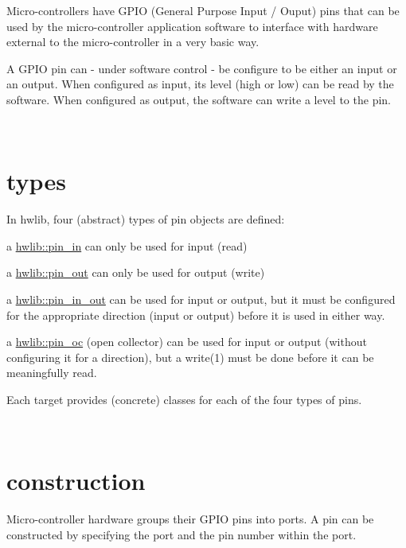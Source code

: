 Micro-\/controllers have G\+P\+IO (General Purpose Input / Ouput) pins that can be used by the micro-\/controller application software to interface with hardware external to the micro-\/controller in a very basic way.

A G\+P\+IO pin can -\/ under software control -\/ be configure to be either an input or an output. When configured as input, its level (high or low) can be read by the software. When configured as output, the software can write a level to the pin.

~\newline
 

\hypertarget{pins_pin-types}{}\section{types}\label{pins_pin-types}
In hwlib, four (abstract) types of pin objects are defined\+:


\begin{DoxyItemize}
\item a \hyperlink{classhwlib_1_1pin__in}{hwlib\+::pin\+\_\+in} can only be used for input (read)
\item a \hyperlink{classhwlib_1_1pin__out}{hwlib\+::pin\+\_\+out} can only be used for output (write)
\item a \hyperlink{classhwlib_1_1pin__in__out}{hwlib\+::pin\+\_\+in\+\_\+out} can be used for input or output, but it must be configured for the appropriate direction (input or output) before it is used in either way.
\item a \hyperlink{classhwlib_1_1pin__oc}{hwlib\+::pin\+\_\+oc} (open collector) can be used for input or output (without configuring it for a direction), but a write(1) must be done before it can be meaningfully read.
\end{DoxyItemize}

Each target provides (concrete) classes for each of the four types of pins.


\begin{DoxyCodeInclude}
\end{DoxyCodeInclude}
 ~\newline
 

\hypertarget{pins_pin-construction}{}\section{construction}\label{pins_pin-construction}
Micro-\/controller hardware groups their G\+P\+IO pins into ports. A pin can be constructed by specifying the port and the pin number within the port.


